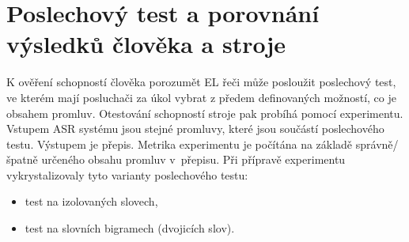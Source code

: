 \section{Poslechový test a porovnání výsledků člověka a stroje}
\label{chap:realisation:listening}


K ověření schopností člověka porozumět EL řeči může posloužit poslechový test, ve kterém mají posluchači za úkol vybrat z předem definovaných možností, co je obsahem promluv.
Otestování schopností stroje pak probíhá pomocí experimentu.
Vstupem ASR systému jsou stejné promluvy, které jsou součástí poslechového testu.
Výstupem je přepis.
Metrika experimentu je počítána na základě správně/špatně určeného obsahu promluv v~přepisu.
Při přípravě experimentu vykrystalizovaly tyto varianty poslechového testu:

\begin{itemize}
  \item test na izolovaných slovech,
  \item test na slovních bigramech (dvojicích slov).
\end{itemize}


